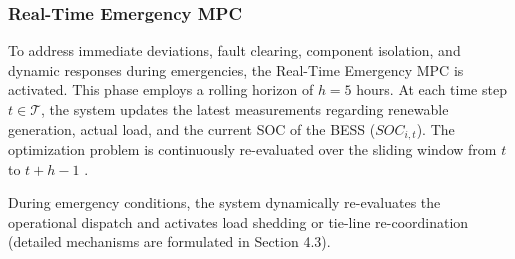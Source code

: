 \subsubsection{Real-Time Emergency MPC}

To address immediate deviations, fault clearing, component isolation, and dynamic responses during emergencies, the Real-Time Emergency MPC is activated. This phase employs a rolling horizon of $h = 5$ hours. At each time step $t \in \mathcal{T}$, the system updates the latest measurements regarding renewable generation, actual load, and the current SOC of the BESS ($SOC_{i,t}$). The optimization problem is continuously re-evaluated over the sliding window from $t$ to $t + h - 1$ \cite{Hermans2024_MPC}.

During emergency conditions, the system dynamically re-evaluates the operational dispatch and activates load shedding or tie-line re-coordination (detailed mechanisms are formulated in Section 4.3).

